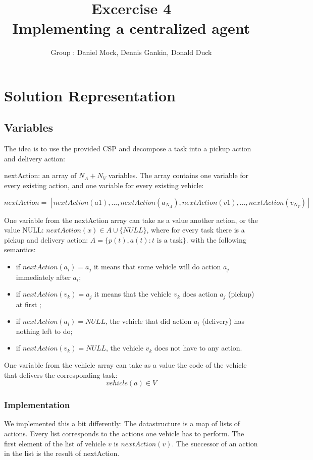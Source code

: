 \documentclass[11pt]{article}
\title{\bf Excercise 4\\ Implementing a centralized agent}
\author{Group \textnumero 29 : Daniel Mock, Dennis Gankin, Donald Duck}
\begin{document}
\maketitle

\section{Solution Representation}

\subsection{Variables}
The idea is to use the provided CSP and decompose a task into a pickup action and delivery action:

nextAction: 
an array of $N_A +N_V$ variables. 
The array contains one variable	for every existing action, and one variable for every existing vehicle:
\begin {center}
$nextAction = [nextAction(a1), . . . , nextAction(a_{N_A}
), nextAction(v1), . . ., nextAction(v_{N_V}
)]$
\end{center}
One variable from the nextAction array can take as a value another action,
or the value NULL:
$nextAction(x) \in A \cup \{NULL\}$, where for every task there is a pickup and delivery action:
$A = \{p(t), a(t) \colon t \text{ is a task}\}$.
with the following semantics:
\begin{itemize}
	\item  if $nextAction(a_i) = a_j$ it means that some vehicle will do action $a_j$ immediately after $a_i$;
	\item  if $nextAction(v_k) = a_j$ it means that the vehicle $v_k$ does action $a_j$ (pickup) at first ;
	\item if $nextAction(a_i) = NULL$, the vehicle that did action $a_i$ (delivery) has nothing left to do;
	\item if $nextAction(v_k) = NULL$, the vehicle $v_k$ does not have to any action.
\end{itemize}

One variable from the vehicle array can take as a value the code of the
vehicle that delivers the corresponding task:
$$ vehicle(a) \in V$$

\subsubsection{Implementation}
We implemented this a bit differently:
The datastructure is a map of lists of actions.
Every list corresponds to the actions one vehicle has to perform.
The first element of the list of vehicle $v$ is $nextAction(v)$.
The successor of an action in the list is the result of nextAction.
\end{document}
